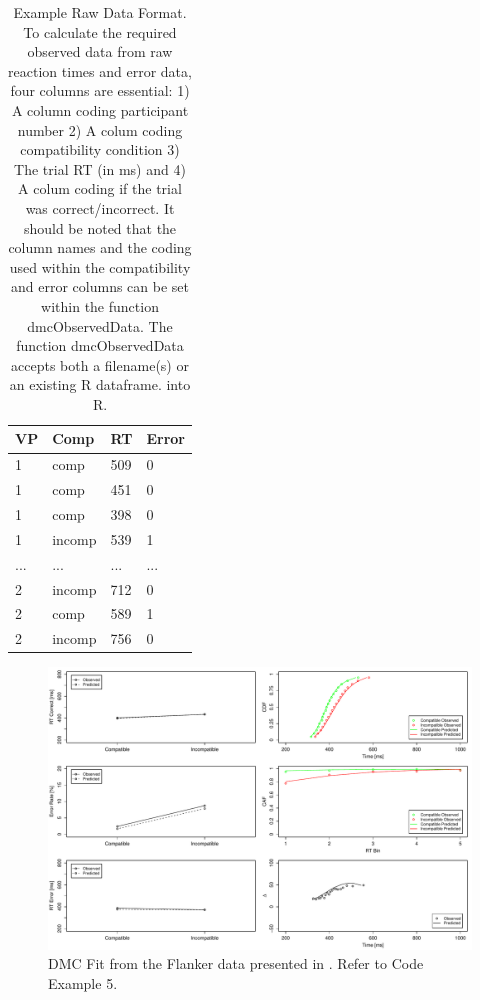 \begin{table}
    \centering
    \caption{
        Example Raw Data Format. To calculate the required observed data from
        raw reaction times and error data, four columns are essential: 1) A
        column coding participant number 2) A colum coding compatibility
        condition 3) The trial RT (in ms) and 4) A colum coding if the trial
        was correct/incorrect. It should be noted that the column names and the
        coding used within the compatibility and error columns can be set
        within the function dmcObservedData. The function dmcObservedData
        accepts both a filename(s) or an existing R dataframe.
        into R.
    }
    \begin{tabular}{llll}
        \hline
        VP&Comp&RT&Error\\ 
        \hline
        1&comp&509&0\\ 
        1&comp&451&0\\ 
        1&comp&398&0\\ 
        1&incomp&539&1\\ 
        ...&...&...&...\\ 
        2&incomp&712&0\\ 
        2&comp&589&1\\ 
        2&incomp&756&0\\ 
    \end{tabular}
    \label{tab:dmc_raw_data}
\end{table}



\begin{figure}[H]
    \includegraphics[width=1\textwidth]{../figures/figure5.pdf}
    \caption{DMC Fit from the Flanker data presented in \textcite{ulrich2015automatic}. Refer to Code Example 5.}
    \label{fig:5}
\end{figure}

